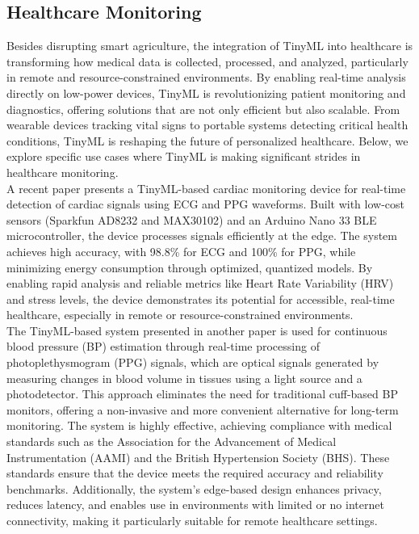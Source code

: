 \documentclass[twocolumn]{article}
\begin{document}
\subsection{Healthcare Monitoring}

Besides disrupting smart agriculture, the integration of TinyML into healthcare is transforming how medical data is collected, processed, and analyzed, particularly in remote and resource-constrained environments. By enabling real-time analysis directly on low-power devices, TinyML is revolutionizing patient monitoring and diagnostics, offering solutions that are not only efficient but also scalable. From wearable devices tracking vital signs to portable systems detecting critical health conditions, TinyML is reshaping the future of personalized healthcare. Below, we explore specific use cases where TinyML is making significant strides in healthcare monitoring.\\[0.1cm]

A recent paper presents a TinyML-based cardiac monitoring device for real-time detection of cardiac signals using ECG and PPG waveforms. Built with low-cost sensors (Sparkfun AD8232 and MAX30102) and an Arduino Nano 33 BLE microcontroller, the device processes signals efficiently at the edge. The system achieves high accuracy, with 98.8\% for ECG and 100\% for PPG, while minimizing energy consumption through optimized, quantized models. By enabling rapid analysis and reliable metrics like Heart Rate Variability (HRV) and stress levels, the device demonstrates its potential for accessible, real-time healthcare, especially in remote or resource-constrained environments.\cite{r_tiny_2024}\\[0.1cm]


The TinyML-based system presented in another paper is used for continuous blood pressure (BP) estimation through real-time processing of photoplethysmogram (PPG) signals, which are optical signals generated by measuring changes in blood volume in tissues using a light source and a photodetector. This approach eliminates the need for traditional cuff-based BP monitors, offering a non-invasive and more convenient alternative for long-term monitoring. The system is highly effective, achieving compliance with medical standards such as the Association for the Advancement of Medical Instrumentation (AAMI) and the British Hypertension Society (BHS). These standards ensure that the device meets the required accuracy and reliability benchmarks. Additionally, the system’s edge-based design enhances privacy, reduces latency, and enables use in environments with limited or no internet connectivity, making it particularly suitable for remote healthcare settings. \cite{sun_case_2023}\\[0.1cm]
\end{document}
